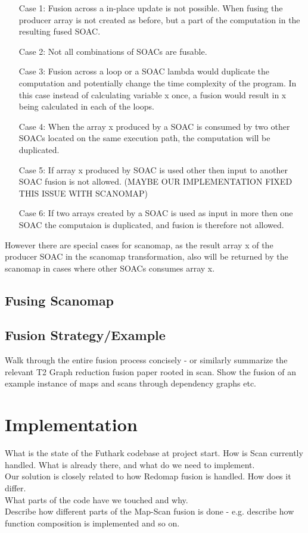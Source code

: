 \documentclass[11pt]{article}
\begin{document}
\begin{itemize}
\item[Case 1:] Fusion across a in-place update is not possible. When fusing the producer array is not created as before, but a part of the computation in the resulting fused SOAC.
\item[Case 2:] Not all combinations of SOACs are fusable.
\item[Case 3:] Fusion across a loop or a SOAC lambda would duplicate the computation and potentially change the time complexity of the program. In this case instead of calculating variable x once, a fusion would result in x being calculated in each of the loops. 
\item[Case 4:] When the array x produced by a SOAC is consumed by two other SOACs located on the same execution path, the computation will be duplicated.
\item[Case 5:] If array x produced by SOAC is used other then input to another SOAC fusion is not allowed. (MAYBE OUR IMPLEMENTATION FIXED THIS ISSUE WITH SCANOMAP)
\item[Case 6:] If two arrays created by a SOAC is used as input in more then one SOAC the computaion is duplicated, and fusion is therefore not allowed.
\end{itemize}

However there are special cases for scanomap, as the result array x of the producer SOAC in the scanomap transformation, also will be returned by the scanomap in cases where other SOACs consumes array x.


\subsection{Fusing Scanomap}
\subsection{Fusion Strategy/Example}
Walk through the entire fusion process concisely - or similarly summarize the relevant T2 Graph reduction fusion paper rooted in scan.
Show the fusion of an example instance of maps and scans through dependency graphs etc.

\section{Implementation}

What is the state of the Futhark codebase at project start. How is Scan currently handled. What is already there, and what do we need to implement.\\
Our solution is closely related to how Redomap fusion is handled. How does it differ.\\
What parts of the code have we touched and why.\\
Describe how different parts of the Map-Scan fusion is done - e.g. describe how function composition is implemented and so on.
\end{document}
